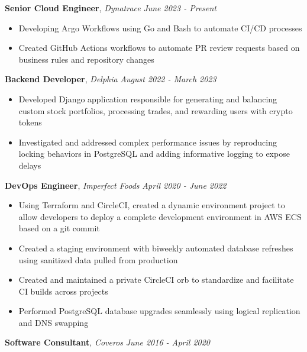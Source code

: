 \documentclass[9pt]{article}
\newenvironment{changemargin}[2]{%
  \begin{list}{}{%
    \setlength{\topsep}{0pt}%
    \setlength{\leftmargin}{#1}%
    \setlength{\rightmargin}{#2}%
    \setlength{\listparindent}{\parindent}%
    \setlength{\itemindent}{\parindent}%
    \setlength{\parsep}{\parskip}%
  }%
  \item[]}{\end{list}
}
\newenvironment{body} {
	\vspace*{-10pt}
	\begin{changemargin}{-0.25in}{-0.5in}
  }	
	{\end{changemargin}
}
\begin{document}
\begin{body}
	\vspace{14pt}
        \textbf{Senior Cloud Engineer}, \emph{Dynatrace} \hfill \emph{June 2023 - Present}\\
	\vspace*{-4pt}
	\begin{itemize} \itemsep -0pt  %
		\item  Developing Argo Workflows using Go and Bash to automate CI/CD processes
        \item  Created GitHub Actions workflows to automate PR review requests based on business rules and repository changes
	\end{itemize}
        \textbf{Backend Developer}, \emph{Delphia} \hfill \emph{August 2022 - March 2023}\\
	\vspace*{-4pt}
	\begin{itemize} \itemsep -0pt  %
		\item  Developed Django application responsible for generating and balancing custom stock portfolios, processing trades, and rewarding users with crypto tokens
        \item  Investigated and addressed complex performance issues by reproducing locking behaviors in PostgreSQL and adding informative logging to expose delays
	\end{itemize}
        \textbf{DevOps Engineer}, \emph{Imperfect Foods} \hfill \emph{April 2020 - June 2022}\\
	\vspace*{-4pt}
	\begin{itemize} \itemsep -0pt  %
		\item  Using Terraform and CircleCI, created a dynamic environment project to allow developers to deploy a complete development environment in AWS ECS based on a git commit
		\item  Created a staging environment with biweekly automated database refreshes using sanitized data pulled from production
		\item  Created and maintained a private CircleCI orb to standardize and facilitate CI builds across projects
		\item  Performed PostgreSQL database upgrades seamlessly using logical replication and DNS swapping
	\end{itemize}
	\textbf{Software Consultant}, \emph{Coveros} \hfill \emph{June 2016 - April 2020}\\

\end{body}
\end{document}

